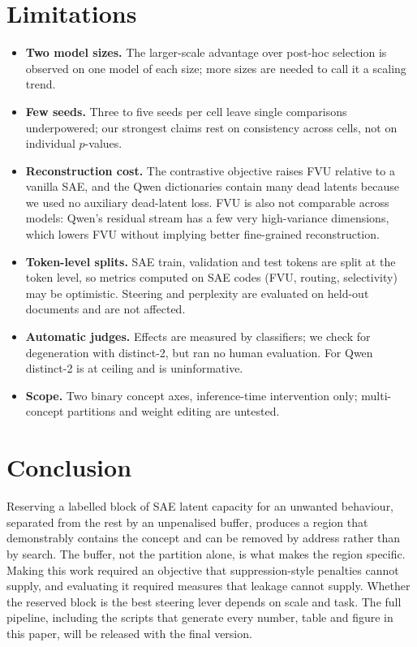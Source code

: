 \documentclass[11pt,a4paper]{article}
\theoremstyle{remark}
\begin{document}
\section{Limitations}
\label{sec:limits}
\begin{itemize}
  \item \textbf{Two model sizes.} The larger-scale advantage over post-hoc selection is observed on
        one model of each size; more sizes are needed to call it a scaling trend.
  \item \textbf{Few seeds.} Three to five seeds per cell leave single comparisons underpowered;
        our strongest claims rest on consistency across cells, not on individual $p$-values.
  \item \textbf{Reconstruction cost.} The contrastive objective raises FVU relative to a vanilla SAE,
        and the Qwen dictionaries contain many dead latents because we used no auxiliary
        dead-latent loss. FVU is also not comparable across models: Qwen's residual stream has
        a few very high-variance dimensions, which lowers FVU without implying better fine-grained
        reconstruction.
  \item \textbf{Token-level splits.} SAE train, validation and test tokens are split at the token level,
        so metrics computed on SAE codes (FVU, routing, selectivity) may be optimistic. Steering
        and perplexity are evaluated on held-out documents and are not affected.
  \item \textbf{Automatic judges.} Effects are measured by classifiers; we check for degeneration
        with distinct-2, but ran no human evaluation. For Qwen distinct-2 is at ceiling and is
        uninformative.
  \item \textbf{Scope.} Two binary concept axes, inference-time intervention only; multi-concept
        partitions and weight editing are untested.
\end{itemize}

\section{Conclusion}
\label{sec:conclusion}
Reserving a labelled block of SAE latent capacity for an unwanted behaviour, separated from the
rest by an unpenalised buffer, produces a region that demonstrably contains the concept and can be
removed by address rather than by search. The buffer, not the partition alone, is what makes the
region specific. Making this work required an objective that suppression-style penalties cannot
supply, and evaluating it required measures that leakage cannot supply. Whether the reserved block
is the best steering lever depends on scale and task. The full pipeline, including the scripts
that generate every number, table and figure in this paper, will be released with the final
version.
\end{document}
